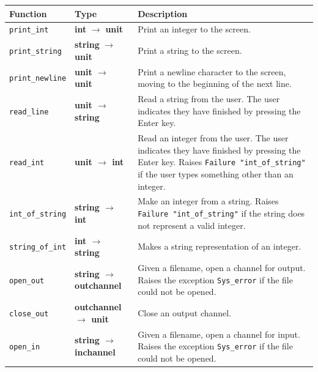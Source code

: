 \documentclass[]{book}
\renewcommand{\arraystretch}{1.2}
\begin{document}
\vspace{8mm}
\bgroup
\def\arraystretch{1.2}
\noindent\begin{tabular}{@{}llp{}@{}} \toprule
Function & Type & Description \\\midrule
\index{print\_int@\texttt{print\_int}}\texttt{print\_int} & \textrm{\textbf{int} $\rightarrow$ \textbf{unit}} & Print an integer to the screen.\\
\index{print\_string@\texttt{print\_string}}\texttt{print\_string} & \textrm{\textbf{string} $\rightarrow$ \textbf{unit}} & Print a string to the screen.\\
\index{print\_newline@\texttt{print\_newline}}\texttt{print\_newline} & \textrm{\textbf{unit $\rightarrow$ unit}} & Print a newline character to the screen, moving to the beginning of the next line.\\
\index{read\_line@\texttt{read\_line}}\texttt{read\_line} & \textrm{\textbf{unit $\rightarrow$ string}} & Read a string from the user. The user indicates they have finished by pressing the Enter key.\\
\index{read\_int@\texttt{read\_int}}\texttt{read\_int} & \textrm{\textbf{unit $\rightarrow$ int}} & Read an integer from the user. The user indicates they have finished by pressing the Enter key. Raises \texttt{Failure\! "int\_of\_string"} if the user types something other than an integer.\\
\index{int\_of\_string@\texttt{int\_of\_string}}\texttt{int\_of\_string} & \textrm{\textbf{string $\rightarrow$ int}} & Make an integer from a string. Raises \texttt{Failure\! "int\_of\_string"} if the string does not represent a valid integer.\\
\index{string\_of\_int@\texttt{string\_of\_int}}\texttt{string\_of\_int} & \textrm{\textbf{int $\rightarrow$ string}} & Makes a string representation of an integer.\\
\index{open\_out}\texttt{open\_out} & \textrm{\textbf{string $\rightarrow$ out\raisebox{2pt}{\_}channel}} & Given a filename, open a channel for output. Raises the exception \index{Sys\_error@\texttt{Sys\_error}}\texttt{Sys\_error} if the file could not be opened.\\
\index{close\_out@\texttt{close\_out}}\texttt{close\_out} & \textrm{\textbf{out\raisebox{2pt}{\_}channel $\rightarrow$ unit}} & Close an output channel.\\
\index{open\_in@\texttt{open\_in}}\texttt{open\_in} & \textrm{\textbf{string $\rightarrow$ in\raisebox{2pt}{\_}channel}} & Given a filename, open a channel for input. Raises the exception \texttt{Sys\_error} if the file could not be opened.\\

\end{tabular}
\end{document}
